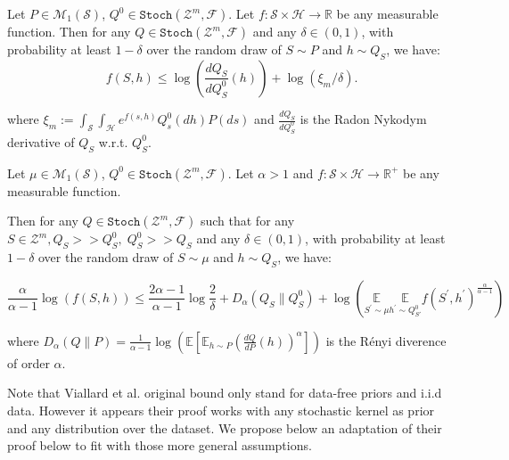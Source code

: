 \begin{noaddcontents}
\begin{proposition}
\label{prop: rivasplata_disintegrated}
 Let $P \in \mathcal{M}_{1}(\mathcal{S})$, $Q^{0} \in \texttt{Stoch}(\mathcal{Z}^m,\mathcal{F})$. Let $f: \mathcal{S} \times \mathcal{H} \rightarrow \mathbb{R}$ be any measurable function.
Then for any $Q \in \texttt{Stoch}(\mathcal{Z}^m,\mathcal{F})$ and any $\delta \in(0,1)$, with probability at least $1-\delta$ over the random draw of $S \sim P$ and $h\sim Q_S$, we have:
$$
f(S,h) \leq \log\left(\frac{dQ_{S}}{dQ_{S}^{0}}(h) \right)+\log (\xi_m / \delta) .
$$

where $\xi_m:=\int_{\mathcal{S}} \int_{\mathcal{H}} e^{f(s, h)} Q_{s}^{0}(d h) P(d s)$ and $\frac{dQ_{S}}{dQ_{S}^{0}}$ is the Radon Nykodym derivative of $Q_S$ w.r.t. $Q_S^0$.
\end{proposition}


\begin{proposition}
  \label{prop: viallard_disintegrated}
   Let $\mu \in \mathcal{M}_{1}(\mathcal{S})$, $Q^{0} \in \texttt{Stoch}(\mathcal{Z}^m,\mathcal{F})$. Let  $\alpha>1$ and  $f: \mathcal{S} \times \mathcal{H} \rightarrow \mathbb{R}^+$ be any measurable function.

   Then for any $Q \in \texttt{Stoch}(\mathcal{Z}^m,\mathcal{F})$ such that for any $S\in\mathcal{Z}^m, Q_S>>Q_S^0,\; Q_S^0>>Q_S $ and any $\delta \in(0,1)$, with probability at least $1-\delta$ over the random draw of $S \sim \mu$ and $h\sim Q_S$, we have:

   \[\frac{\alpha}{\alpha-1} \log (f(S,h)) \leq \frac{2 \alpha-1}{\alpha-1} \log \frac{2}{\delta}+D_{\alpha}\left(Q_{S} \| Q_S^0\right)+
   \log \left(\underset{S^{\prime} \sim \mu}{\mathbb{E}} \underset{h^{\prime} \sim Q_{S'}^0}{\mathbb{E}}
   f\left(S^{\prime},h^{\prime}\right)^{\frac{\alpha}{\alpha-1}}\right) \]

   where $D_\alpha(Q\|P)= \frac{1}{\alpha-1}\log\left( \mathbb{E}\left[ \mathbb{E}_{h\sim P} \left(\frac{dQ}{dP}(h)\right)^\alpha   \right] \right)$ is the Rényi diverence of order $\alpha$.

\end{proposition}

Note that Viallard et al. original bound only stand for data-free priors and i.i.d data. However it appears their proof works with any stochastic kernel as prior and any distribution over the dataset. We propose below an adaptation of their proof below to fit with those more general assumptions.



\end{noaddcontents}
